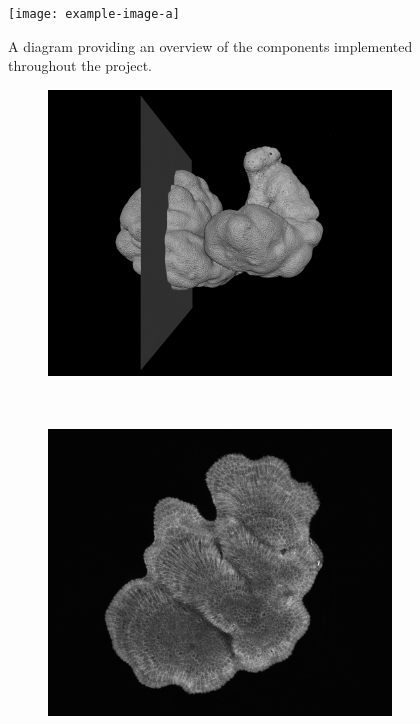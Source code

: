 \newpage

\begin{figure}[!h]
    \centering
    \texttt{[image: example-image-a]}
    \caption{A diagram providing an overview of the components implemented throughout the project.}
    \label{fig:overview}
\end{figure}

\newpage

\begin{figure}[!t]
    \centering
    \begin{subfigure}[t]{0.49\textwidth}
        \centering
        \includegraphics[width=1\textwidth, valign=c]{images/extraction.png}
    \end{subfigure}
    ~
    \begin{subfigure}[t]{0.49\textwidth}
        \centering
        \includegraphics[width=1\textwidth, valign=c]{images/slice-example.png}

\end{subfigure}
\end{figure}
